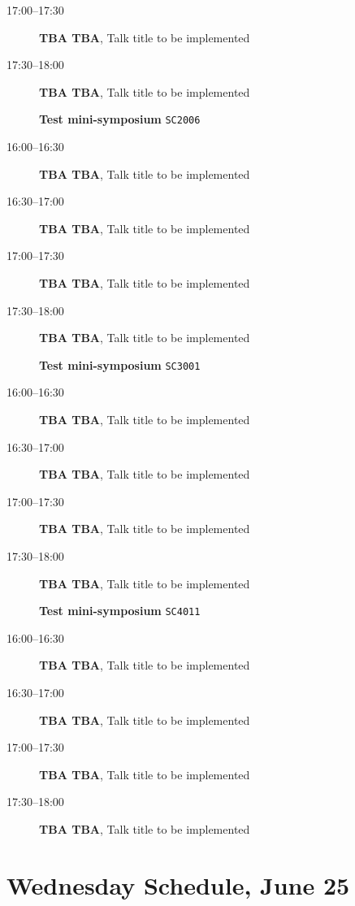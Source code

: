 \documentclass[ILAS2025-program.tex]{subfiles}
\begin{document}
\begin{description}
\begin{description}
        \item[17:00--17:30] \textbf{TBA TBA}, Talk title to be implemented
        \item[17:30--18:00] \textbf{TBA TBA}, Talk title to be implemented
        \end{description}
    \begin{description}
    \item[] \textbf{Test mini-symposium} {\footnotesize\texttt{SC2006}}
    \item[16:00--16:30] \textbf{TBA TBA}, Talk title to be implemented
        \item[16:30--17:00] \textbf{TBA TBA}, Talk title to be implemented
        \item[17:00--17:30] \textbf{TBA TBA}, Talk title to be implemented
        \item[17:30--18:00] \textbf{TBA TBA}, Talk title to be implemented
        \end{description}
    \begin{description}
    \item[] \textbf{Test mini-symposium} {\footnotesize\texttt{SC3001}}
    \item[16:00--16:30] \textbf{TBA TBA}, Talk title to be implemented
        \item[16:30--17:00] \textbf{TBA TBA}, Talk title to be implemented
        \item[17:00--17:30] \textbf{TBA TBA}, Talk title to be implemented
        \item[17:30--18:00] \textbf{TBA TBA}, Talk title to be implemented
        \end{description}
    \begin{description}
    \item[] \textbf{Test mini-symposium} {\footnotesize\texttt{SC4011}}
    \item[16:00--16:30] \textbf{TBA TBA}, Talk title to be implemented
        \item[16:30--17:00] \textbf{TBA TBA}, Talk title to be implemented
        \item[17:00--17:30] \textbf{TBA TBA}, Talk title to be implemented
        \item[17:30--18:00] \textbf{TBA TBA}, Talk title to be implemented
        \end{description}
    \end{description}
    \newpage

\section{Wednesday Schedule, June 25}
    
\end{document}
